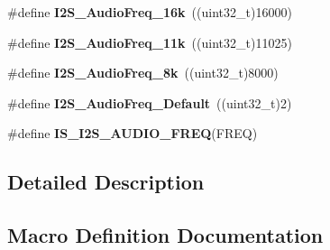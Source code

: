 \begin{DoxyCompactItemize}
\item 
\hypertarget{group___s_p_i___i2_s___audio___frequency_ga5b8f2f8393e022becf0dbb04d1b01950}{}\#define {\bfseries I2\+S\+\_\+\+Audio\+Freq\+\_\+16k}~((uint32\+\_\+t)16000)\label{group___s_p_i___i2_s___audio___frequency_ga5b8f2f8393e022becf0dbb04d1b01950}

\item 
\hypertarget{group___s_p_i___i2_s___audio___frequency_ga3adf95fadd1ad75670ed1babd5faca39}{}\#define {\bfseries I2\+S\+\_\+\+Audio\+Freq\+\_\+11k}~((uint32\+\_\+t)11025)\label{group___s_p_i___i2_s___audio___frequency_ga3adf95fadd1ad75670ed1babd5faca39}

\item 
\hypertarget{group___s_p_i___i2_s___audio___frequency_ga7868ac234485a80d45586dd87cd00043}{}\#define {\bfseries I2\+S\+\_\+\+Audio\+Freq\+\_\+8k}~((uint32\+\_\+t)8000)\label{group___s_p_i___i2_s___audio___frequency_ga7868ac234485a80d45586dd87cd00043}

\item 
\hypertarget{group___s_p_i___i2_s___audio___frequency_ga30f78e8214e8a91cdb6d6360c1d3f18d}{}\#define {\bfseries I2\+S\+\_\+\+Audio\+Freq\+\_\+\+Default}~((uint32\+\_\+t)2)\label{group___s_p_i___i2_s___audio___frequency_ga30f78e8214e8a91cdb6d6360c1d3f18d}

\item 
\#define {\bfseries I\+S\+\_\+\+I2\+S\+\_\+\+A\+U\+D\+I\+O\+\_\+\+F\+R\+E\+Q}(F\+R\+E\+Q)
\end{DoxyCompactItemize}


\subsection{Detailed Description}


\subsection{Macro Definition Documentation}
\hypertarget{group___s_p_i___i2_s___audio___frequency_gaf39d917f4a38fd9916ec347fb055391c}{}
